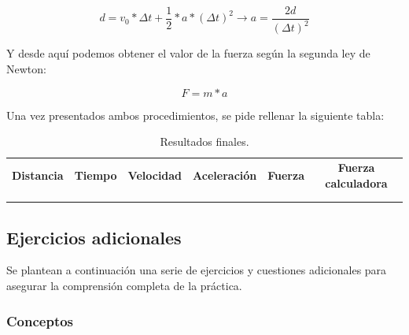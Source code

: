 \[d = v_0 * \Delta t + \frac{1}{2}*a*(\Delta t)^2 \rightarrow a = \frac{2d}{(\Delta t)^2}\]

Y desde aquí podemos obtener el valor de la fuerza según la segunda ley de Newton:

\[F=m*a\]

Una vez presentados ambos procedimientos, se pide rellenar la siguiente tabla:

\begin{table}[H]
    \centering
    \begin{adjustbox}{max width=\textwidth,center}
        \begin{tabular}{|c|c|c|c|c|c|}
        \hline
        \textbf{Distancia} & \textbf{Tiempo} & \textbf{Velocidad} & \textbf{Aceleración} & \textbf{Fuerza} & \textbf{Fuerza calculadora} \\
          &  &  &  &  &  \\
          &  &  &  &  &  \\
        \hline
        \end{tabular}
    \end{adjustbox}
    \caption{Resultados finales.}
    \label{tab:resultadosFinales}
\end{table}


\subsection*{Ejercicios adicionales}

Se plantean a continuación una serie de ejercicios y cuestiones adicionales para asegurar la comprensión completa de la práctica.

\subsubsection*{Conceptos}

